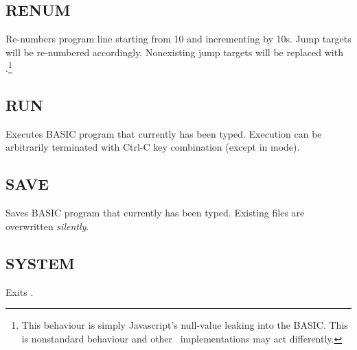\subsection{RENUM}
    \par
    Re-numbers program line starting from 10 and incrementing by 10s. Jump targets will be re-numbered accordingly. Nonexisting jump targets will be replaced with .\footnote{This behaviour is simply Javascript's null-value leaking into the BASIC. This is nonstandard behaviour and other \tbas\ implementations may act differently.}
    
\subsection{RUN}
    \par
    Executes BASIC program that currently has been typed. Execution can be arbitrarily terminated with Ctrl-C key combination (except in  mode).
    
\subsection{SAVE}
    \par
    Saves BASIC program that currently has been typed. Existing files are overwritten \emph{silently}.

\subsection{SYSTEM}
    \par
    Exits \tbas.
